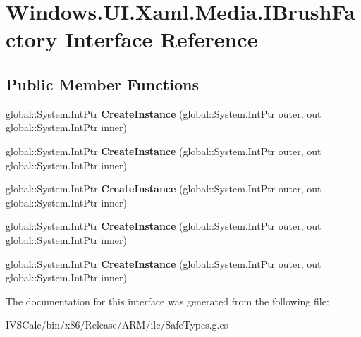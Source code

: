 \hypertarget{interface_windows_1_1_u_i_1_1_xaml_1_1_media_1_1_i_brush_factory}{}\section{Windows.\+U\+I.\+Xaml.\+Media.\+I\+Brush\+Factory Interface Reference}
\label{interface_windows_1_1_u_i_1_1_xaml_1_1_media_1_1_i_brush_factory}
\subsection*{Public Member Functions}
\begin{DoxyCompactItemize}
\item 
\mbox{\label{interface_windows_1_1_u_i_1_1_xaml_1_1_media_1_1_i_brush_factory_af15af511b4e9e6acc46ddef1f037631b}} 
global\+::\+System.\+Int\+Ptr {\bfseries Create\+Instance} (global\+::\+System.\+Int\+Ptr outer, out global\+::\+System.\+Int\+Ptr inner)
\item 
\mbox{\label{interface_windows_1_1_u_i_1_1_xaml_1_1_media_1_1_i_brush_factory_af15af511b4e9e6acc46ddef1f037631b}} 
global\+::\+System.\+Int\+Ptr {\bfseries Create\+Instance} (global\+::\+System.\+Int\+Ptr outer, out global\+::\+System.\+Int\+Ptr inner)
\item 
\mbox{\label{interface_windows_1_1_u_i_1_1_xaml_1_1_media_1_1_i_brush_factory_af15af511b4e9e6acc46ddef1f037631b}} 
global\+::\+System.\+Int\+Ptr {\bfseries Create\+Instance} (global\+::\+System.\+Int\+Ptr outer, out global\+::\+System.\+Int\+Ptr inner)
\item 
\mbox{\label{interface_windows_1_1_u_i_1_1_xaml_1_1_media_1_1_i_brush_factory_af15af511b4e9e6acc46ddef1f037631b}} 
global\+::\+System.\+Int\+Ptr {\bfseries Create\+Instance} (global\+::\+System.\+Int\+Ptr outer, out global\+::\+System.\+Int\+Ptr inner)
\item 
\mbox{\label{interface_windows_1_1_u_i_1_1_xaml_1_1_media_1_1_i_brush_factory_af15af511b4e9e6acc46ddef1f037631b}} 
global\+::\+System.\+Int\+Ptr {\bfseries Create\+Instance} (global\+::\+System.\+Int\+Ptr outer, out global\+::\+System.\+Int\+Ptr inner)
\end{DoxyCompactItemize}


The documentation for this interface was generated from the following file\+:\begin{DoxyCompactItemize}
\item 
I\+V\+S\+Calc/bin/x86/\+Release/\+A\+R\+M/ilc/Safe\+Types.\+g.\+cs\end{DoxyCompactItemize}
